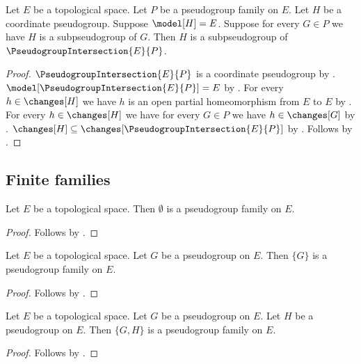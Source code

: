 \begin{theorem}\label{pseudogroup_intersection_greatest}
    Let $E$ be a topological space.
    Let $P$ be a pseudogroup family on $E$.
    Let $H$ be a coordinate pseudogroup.
    Suppose $\model[H]=E$.
    Suppose for every $G\in P$ we have $H$ is a subpseudogroup of $G$.
    Then $H$ is a subpseudogroup of $\PseudogroupIntersection{E}{P}$.
\end{theorem}
\begin{proof}
    $\PseudogroupIntersection{E}{P}$ is a coordinate pseudogroup by
        .
    $\model[\PseudogroupIntersection{E}{P}]=E$ by
        .
    For every $h\in\changes[H]$ we have
        $h$ is an open partial homeomorphism from $E$ to $E$ by
        .
    For every $h\in\changes[H]$ we have for every $G\in P$ we have
        $h\in\changes[G]$ by .
    $\changes[H]\subseteq\changes[\PseudogroupIntersection{E}{P}]$ by
        .
    Follows by .
\end{proof}

\subsection{Finite families}

\begin{classification}\label{empty_pseudogroup_family}
    Let $E$ be a topological space.
    Then $\emptyset$ is a pseudogroup family on $E$.
\end{classification}
\begin{proof}
    Follows by .
\end{proof}

\begin{classification}\label{singleton_pseudogroup_family}
    Let $E$ be a topological space.
    Let $G$ be a pseudogroup on $E$.
    Then $\{G\}$ is a pseudogroup family on $E$.
\end{classification}
\begin{proof}
    Follows by .
\end{proof}

\begin{classification}\label{pair_pseudogroup_family}
    Let $E$ be a topological space.
    Let $G$ be a pseudogroup on $E$.
    Let $H$ be a pseudogroup on $E$.
    Then $\{G,H\}$ is a pseudogroup family on $E$.
\end{classification}
\begin{proof}
    Follows by .
\end{proof}

